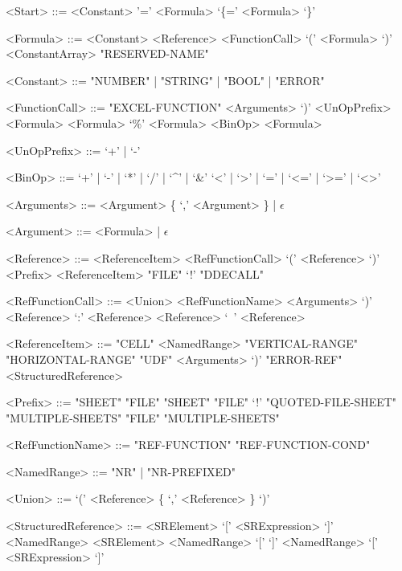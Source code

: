 \begin{grammar}
<Start> ::= <Constant>
	\alt '=' <Formula>
	\alt `\{=' <Formula> `\}'

<Formula> ::= <Constant>
         \alt <Reference>
         \alt <FunctionCall>
         \alt `(' <Formula> `)'
         \alt <ConstantArray>
         \alt "RESERVED-NAME"
         
<Constant> ::= "NUMBER" | "STRING" | "BOOL" | "ERROR"
         
<FunctionCall> ::= "EXCEL-FUNCTION" <Arguments> `)'
		\alt <UnOpPrefix> <Formula>
		\alt <Formula> `\%'
		\alt <Formula> <BinOp> <Formula>
		
<UnOpPrefix> ::= `+' | `-'

<BinOp> ::= `+' | `-' | `*' | `/' | `\textasciicircum' | `\&'
	\alt `<' | `>' | `=' | `<=' | `>=' | `<>'

	
<Arguments> ::= <Argument> \{ `,' <Argument> \} | $\epsilon$

<Argument> ::= <Formula> | $\epsilon$

<Reference> ::= <ReferenceItem>
    \alt <RefFunctionCall>
	\alt `(' <Reference> `)' 
	\alt <Prefix> <ReferenceItem>
	\alt "FILE" `!' "DDECALL"

<RefFunctionCall> ::= <Union>
    \alt <RefFunctionName> <Arguments> `)'
    \alt <Reference> `:' <Reference>
	\alt <Reference> `\ ' <Reference>
    
<ReferenceItem> ::= "CELL"
	\alt <NamedRange>
	\alt "VERTICAL-RANGE"
	\alt "HORIZONTAL-RANGE"
	\alt "UDF" <Arguments> `)'
	\alt "ERROR-REF"
	\alt <StructuredReference>
	
<Prefix> ::= "SHEET"
	\alt "FILE" "SHEET"
	\alt "FILE" `!'
	\alt "QUOTED-FILE-SHEET"
	\alt "MULTIPLE-SHEETS"
	\alt "FILE" "MULTIPLE-SHEETS"

<RefFunctionName> ::= "REF-FUNCTION"
			\alt "REF-FUNCTION-COND"
	
<NamedRange> ::= "NR" | "NR-PREFIXED"

<Union> ::= `(' <Reference> \{ `,' <Reference> \} `)'

<StructuredReference> ::= <SRElement>
	\alt `[' <SRExpression> `]'
	\alt <NamedRange> <SRElement>
	\alt <NamedRange> `[' `]'
	\alt <NamedRange> `[' <SRExpression> `]'



\end{grammar}
